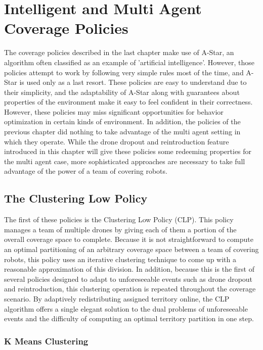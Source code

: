 \chapter{Intelligent and Multi Agent Coverage Policies}

The coverage policies described in the last chapter make use of A-Star, an algorithm often classified as an example of 'artificial intelligence'. However, those policies attempt to work by following very simple rules most of the time, and A-Star is used only as a last resort. These policies are easy to understand due to their simplicity, and the adaptability of A-Star along with guarantees about properties of the environment make it easy to feel confident in their correctness. However, these policies may miss significant opportunities for behavior optimization in certain kinds of environment. In addition, the policies of the previous chapter did nothing to take advantage of the multi agent setting in which they operate. While the drone dropout and reintroduction feature introduced in this chapter will give these policies some redeeming properties for the multi agent case, more sophisticated approaches are necessary to take full advantage of the power of a team of covering robots.

\section{The Clustering Low Policy}

The first of these policies is the Clustering Low Policy (CLP). This policy manages a team of multiple drones by giving each of them a portion of the overall coverage space to complete. Because it is not straightforward to compute an optimal partitioning of an arbitrary coverage space between a team of covering robots, this policy uses an iterative clustering technique to come up with a reasonable approximation of this division. In addition, because this is the first of several policies designed to adapt to unforeseeable events such as drone dropout and reintroduction, this clustering operation is repeated throughout the coverage scenario. By adaptively redistributing assigned territory online, the CLP algorithm offers a single elegant solution to the dual problems of unforeseeable events and the difficulty of computing an optimal territory partition in one step.

\subsection{K Means Clustering}

